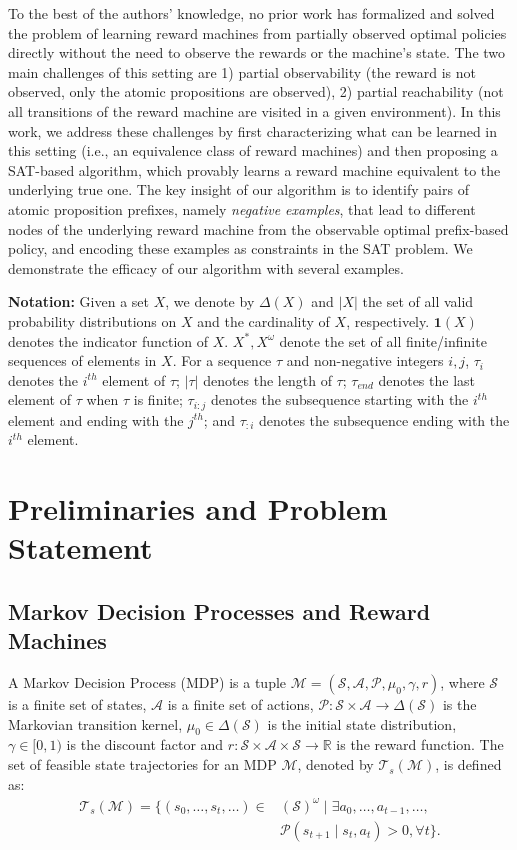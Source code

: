\documentclass[letterpaper, 10 pt, conference]{ieeeconf}
\begin{document}
To the best of the authors' knowledge, no prior work has formalized and solved the problem of learning reward machines from partially observed optimal policies directly without the need to observe the rewards or the machine's state. The two main challenges of this setting are 1) partial observability (the reward is not observed, only the atomic propositions are observed), 2) partial reachability (not all transitions of the reward machine are visited in a given environment). In this work, we address these challenges by first characterizing what can be learned in this setting (i.e., an equivalence class of reward machines) and then proposing a SAT-based algorithm, which provably learns a reward machine equivalent to the underlying true one. The key insight of our algorithm is to identify pairs of atomic proposition prefixes, namely \emph{negative examples}, that lead to different nodes of the underlying reward machine from the observable optimal prefix-based policy, and encoding these examples as constraints in the SAT problem. We demonstrate the efficacy of our algorithm with several examples. 

{\bf Notation:} Given a set $X$, we denote by $\Delta(X)$ and $|X|$ the set of all valid probability distributions on $X$ and the cardinality of $X$, respectively. $\mathbf{1}(X)$ denotes the indicator function of $X$. $X^*, X^\omega$ denote the set of all finite/infinite sequences of elements in $X$. For a sequence $\tau$ and non-negative integers $i,j$, $\tau_i$ denotes the $i^{th}$ element of $\tau$; $|\tau|$ denotes the length of $\tau$; $\tau_{end}$ denotes the last element of $\tau$ when $\tau$ is finite; $\tau_{i:j}$ denotes the subsequence starting with the $i^{th}$ element and ending with the $j^{th}$; and $\tau_{:i}$ denotes the subsequence ending with the $i^{th}$ element.


\section{Preliminaries and Problem Statement}

\subsection{Markov Decision Processes and Reward Machines}\label{sec:mdp}
A Markov Decision Process (MDP) is a tuple $\mathcal{M} = (\mathcal{S},\mathcal{A}, \mathcal{P},\mu_0, \gamma, r)$, where $\mathcal{S}$ is a finite set of states, $\mathcal{A}$ is a finite set of actions, $\mathcal{P}:\mathcal{S}\times \mathcal{A} \to \Delta(\mathcal{S})$ is the Markovian transition kernel, $\mu_0 \in \Delta(\mathcal{S})$ is the initial state distribution, $\gamma \in [0,1)$ is the discount factor and $r:\mathcal{S}\times \mathcal{A}\times \mathcal{S}\to \mathbb{R}$ is the reward function. The set of feasible state trajectories for an MDP $\mathcal{M}$, denoted by $\mathcal{T}_s(\mathcal{M})$, is defined as:
\begin{align*}
    \mathcal{T}_s(\mathcal{M})
 = \{ (s_0, \ldots, s_t, \ldots) \in &(\mathcal{S})^\omega \mid \exists a_0, \ldots, a_{t-1},\ldots, \\
 &\mathcal{P}(s_{t+1} \mid s_t, a_t) > 0, \forall t \}.
\end{align*}
\end{document}
